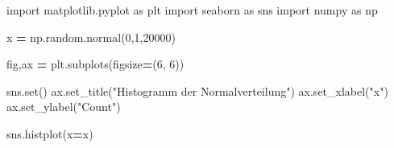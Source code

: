 \documentclass[
  oneside]{book}
\newenvironment{Shaded}{\begin{snugshade}}{\end{snugshade}}
\newcommand{\BuiltInTok}[1]{#1}
\newcommand{\DecValTok}[1]{\textcolor[rgb]{0.00,0.00,0.81}{#1}}
\newcommand{\ImportTok}[1]{#1}
\newcommand{\NormalTok}[1]{#1}
\newcommand{\OperatorTok}[1]{\textcolor[rgb]{0.81,0.36,0.00}{\textbf{#1}}}
\newcommand{\StringTok}[1]{\textcolor[rgb]{0.31,0.60,0.02}{#1}}
\begin{document}
\begin{Shaded}
\begin{Highlighting}[]
\ImportTok{import}\NormalTok{ matplotlib.pyplot }\ImportTok{as}\NormalTok{ plt}
\ImportTok{import}\NormalTok{ seaborn }\ImportTok{as}\NormalTok{ sns}
\ImportTok{import}\NormalTok{ numpy }\ImportTok{as}\NormalTok{ np}

\NormalTok{x }\OperatorTok{=}\NormalTok{ np.random.normal(}\DecValTok{0}\NormalTok{,}\DecValTok{1}\NormalTok{,}\DecValTok{20000}\NormalTok{)}


\NormalTok{fig,ax }\OperatorTok{=}\NormalTok{ plt.subplots(figsize}\OperatorTok{=}\NormalTok{(}\DecValTok{6}\NormalTok{, }\DecValTok{6}\NormalTok{))}

\NormalTok{sns.}\BuiltInTok{set}\NormalTok{()}
\NormalTok{ax.set\_title(}\StringTok{"Histogramm der Normalverteilung"}\NormalTok{) }
\NormalTok{ax.set\_xlabel(}\StringTok{"x"}\NormalTok{)}
\NormalTok{ax.set\_ylabel(}\StringTok{"Count"}\NormalTok{)}

\NormalTok{sns.histplot(x}\OperatorTok{=}\NormalTok{x)}
\end{Highlighting}
\end{Shaded}


  
\end{document}
